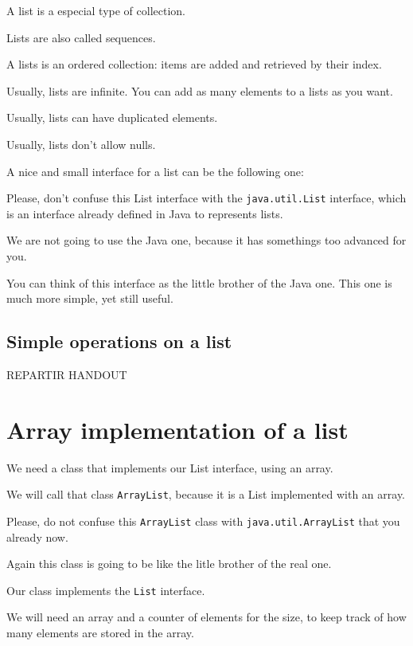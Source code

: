 \documentclass[a4paper, 9pt]{extarticle}
\begin{document}
A list is a especial type of collection.

Lists are also called sequences.

A lists is an ordered collection: items are added and retrieved by their index.

Usually, lists are infinite. You can add as many elements to a lists as you want.

Usually, lists can have duplicated elements.

Usually, lists don't allow nulls.

A nice and small interface for a list can be the following one:


Please, don't confuse this List interface with the \verb+java.util.List+
interface, which is an interface already defined in Java to represents lists.

We are not going to use the Java one, because it has somethings too advanced
for you.

You can think of this interface as the little brother of the Java one. This one
is much more simple, yet still useful.

\subsection{Simple operations on a list}



REPARTIR HANDOUT


\section{Array implementation of a list}

We need a class that implements our List interface, using an array.

We will call that class \verb+ArrayList+, because it is a List implemented with an array.

Please, do not confuse this \verb+ArrayList+ class with \verb+java.util.ArrayList+ that you already now.

Again this class is going to be like the litle brother of the real one.


Our class implements the \verb+List+ interface.

We will need an array and a counter of elements for the size, to keep track of
how many elements are stored in the array.
\end{document}
